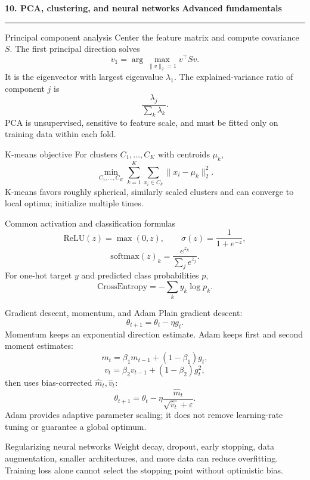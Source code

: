 \documentclass[10pt,a4paper]{article}
\newcommand{\sectionbanner}[2]{%
  \vspace{2mm}
  {\color{navy}\Large\bfseries #1}\hfill
  {\color{blue}\bfseries #2}
  \par\vspace{1mm}\color{line}\rule{\linewidth}{0.8pt}\color{ink}\vspace{2mm}
}
\begin{document}
\sectionbanner{10. PCA, clustering, and neural networks}{Advanced fundamentals}

\begin{formulabox}{Principal component analysis}
Center the feature matrix and compute covariance $S$. The first principal direction solves
\[
v_1=\arg\max_{\|v\|_2=1}v^\top S v.
\]
It is the eigenvector with largest eigenvalue $\lambda_1$. The explained-variance ratio of component $j$ is
\[
\frac{\lambda_j}{\sum_k\lambda_k}.
\]
PCA is unsupervised, sensitive to feature scale, and must be fitted only on training data within each fold.
\end{formulabox}

\begin{formulabox}{K-means objective}
For clusters $C_1,\ldots,C_K$ with centroids $\mu_k$,
\[
\min_{C_1,\ldots,C_K}\sum_{k=1}^{K}\sum_{x_i\in C_k}\|x_i-\mu_k\|_2^2.
\]
K-means favors roughly spherical, similarly scaled clusters and can converge to local optima; initialize multiple times.
\end{formulabox}

\begin{formulabox}{Common activation and classification formulas}
\[
\mathrm{ReLU}(z)=\max(0,z),\qquad
\sigma(z)=\frac{1}{1+e^{-z}},
\]
\[
\mathrm{softmax}(z)_k=\frac{e^{z_k}}{\sum_j e^{z_j}}.
\]
For one-hot target $y$ and predicted class probabilities $p$,
\[
\mathrm{CrossEntropy}=-\sum_k y_k\log p_k.
\]
\end{formulabox}

\begin{formulabox}{Gradient descent, momentum, and Adam}
Plain gradient descent:
\[
\theta_{t+1}=\theta_t-\eta g_t.
\]
Momentum keeps an exponential direction estimate. Adam keeps first and second moment estimates:
\[
m_t=\beta_1m_{t-1}+(1-\beta_1)g_t,
\]
\[
v_t=\beta_2v_{t-1}+(1-\beta_2)g_t^2,
\]
then uses bias-corrected $\hat m_t,\hat v_t$:
\[
\theta_{t+1}=\theta_t-\eta\frac{\hat m_t}{\sqrt{\hat v_t}+\varepsilon}.
\]
Adam provides adaptive parameter scaling; it does not remove learning-rate tuning or guarantee a global optimum.
\end{formulabox}

\begin{keybox}{Regularizing neural networks}
Weight decay, dropout, early stopping, data augmentation, smaller architectures, and more data can reduce overfitting. Training loss alone cannot select the stopping point without optimistic bias.
\end{keybox}
\end{document}
